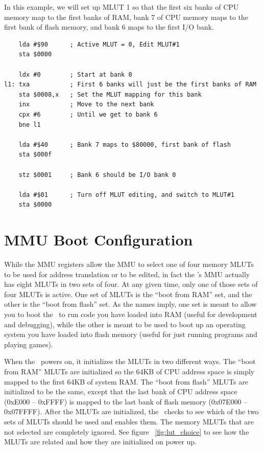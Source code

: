 In this example, we will set up MLUT 1 so that the first six banks of CPU memory map to the first banks of RAM, bank 7 of CPU memory maps to the first bank of flash memory, and bank 6 maps to the first I/O bank.

\begin{verbatim}
    lda #$90      ; Active MLUT = 0, Edit MLUT#1
    sta $0000

    ldx #0        ; Start at bank 0
l1: txa           ; First 6 banks will just be the first banks of RAM
    sta $0008,x   ; Set the MLUT mapping for this bank
    inx           ; Move to the next bank
    cpx #6        ; Until we get to bank 6
    bne l1

    lda #$40      ; Bank 7 maps to $80000, first bank of flash
    sta $000f

    stz $0001     ; Bank 6 should be I/O bank 0

    lda #$01      ; Turn off MLUT editing, and switch to MLUT#1
    sta $0000
\end{verbatim}

\section*{MMU Boot Configuration}
\label{pg:mmu_boot_config}

While the MMU registers allow the MMU to select one of four memory MLUTs to be used for address translation or to be edited, in fact the \jr's MMU actually has eight MLUTs in two sets of four. At any given time, only one of those sets of four MLUTs is active. One set of MLUTs is the ``boot from RAM'' set, and the other is the ``boot from flash'' set. As the names imply, one set is meant to allow you to boot the \jr\ to run code you have loaded into RAM (useful for development and debugging), while the other is meant to be used to boot up an operating system you have loaded into flash memory (useful for just running programs and playing games).

When the \jr\ powers on, it initializes the MLUTs in two different ways. The ``boot from RAM'' MLUTs are initialized so the 64KB of CPU address space is simply mapped to the first 64KB of system RAM. The ``boot from flash'' MLUTs are initialized to be the same, except that the last bank of CPU address space (0xE000 -- 0xFFFF) is mapped to the last bank of flash memory (0x07E000 -- 0x07FFFF). After the MLUTs are initialized, the \jr\ checks to see which of the two sets of MLUTs should be used and enables them. The memory MLUTs that are not selected are completely ignored. See figure ~\ref{fig:lut_choice} to see how the MLUTs are related and how they are initialized on power up.


